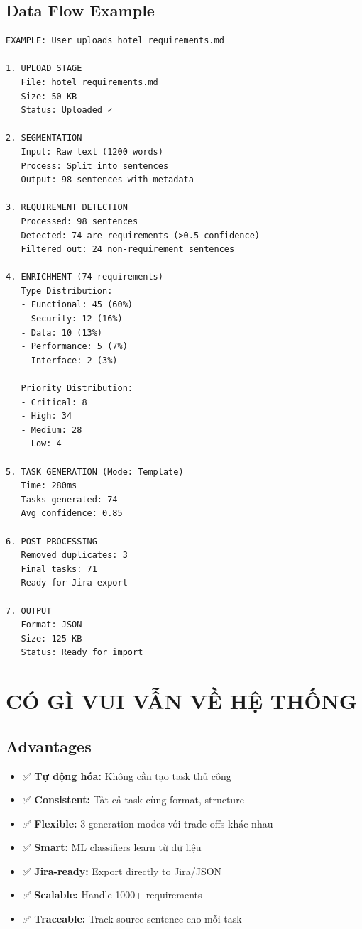 \documentclass[12pt, a4paper]{report}
\begin{document}
\section{Data Flow Example}

\begin{tcolorbox}[colback=yellow!5]
\begin{lstlisting}
EXAMPLE: User uploads hotel_requirements.md

1. UPLOAD STAGE
   File: hotel_requirements.md
   Size: 50 KB
   Status: Uploaded ✓

2. SEGMENTATION
   Input: Raw text (1200 words)
   Process: Split into sentences
   Output: 98 sentences with metadata

3. REQUIREMENT DETECTION
   Processed: 98 sentences
   Detected: 74 are requirements (>0.5 confidence)
   Filtered out: 24 non-requirement sentences

4. ENRICHMENT (74 requirements)
   Type Distribution:
   - Functional: 45 (60%)
   - Security: 12 (16%)
   - Data: 10 (13%)
   - Performance: 5 (7%)
   - Interface: 2 (3%)

   Priority Distribution:
   - Critical: 8
   - High: 34
   - Medium: 28
   - Low: 4

5. TASK GENERATION (Mode: Template)
   Time: 280ms
   Tasks generated: 74
   Avg confidence: 0.85

6. POST-PROCESSING
   Removed duplicates: 3
   Final tasks: 71
   Ready for Jira export

7. OUTPUT
   Format: JSON
   Size: 125 KB
   Status: Ready for import
\end{lstlisting}
\end{tcolorbox}

\newpage

\chapter{CÓ GÌ VUI VẪN VỀ HỆ THỐNG}

\section{Advantages}

\begin{itemize}
    \item ✅ \textbf{Tự động hóa:} Không cần tạo task thủ công
    \item ✅ \textbf{Consistent:} Tất cả task cùng format, structure
    \item ✅ \textbf{Flexible:} 3 generation modes với trade-offs khác nhau
    \item ✅ \textbf{Smart:} ML classifiers learn từ dữ liệu
    \item ✅ \textbf{Jira-ready:} Export directly to Jira/JSON
    \item ✅ \textbf{Scalable:} Handle 1000+ requirements
    \item ✅ \textbf{Traceable:} Track source sentence cho mỗi task
\end{itemize}
\end{document}
